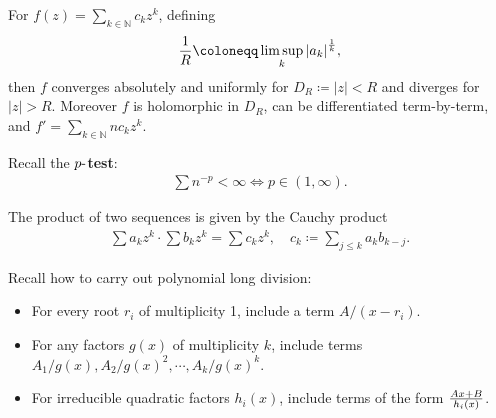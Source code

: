\begin{proposition}

For \(f(z) = \sum_{k\in {\mathbb{N}}} c_k z^k\), defining
\begin{align*}
{1\over R} \coloneqq\limsup_{k} {\left\lvert {a_k} \right\rvert}^{1\over k}
,\end{align*}
then \(f\) converges absolutely and uniformly for
\(D_R \coloneqq{\left\lvert {z} \right\rvert} < R\) and diverges for
\({\left\lvert {z} \right\rvert} > R\). Moreover \(f\) is holomorphic in
\(D_R\), can be differentiated term-by-term, and
\(f' = \sum_{k\in {\mathbb{N}}} n c_k z^k\).

\end{proposition}

\begin{fact}

Recall the \textbf{\(p{\hbox{-}}\)test}:
\begin{align*}
\sum n^{-p} < \infty \iff p \in (1, \infty)
.\end{align*}

\end{fact}

\begin{fact}

The product of two sequences is given by the Cauchy product
\begin{align*}
\sum a_kz^k \cdot \sum b_k z^k = \sum c_k z^k,\quad c_k \coloneqq\sum_{j\leq k} a_k b_{k-j}
.\end{align*}

\end{fact}

\begin{fact}

Recall how to carry out polynomial long division:


\end{fact}

\begin{fact}

\envlist

\begin{itemize}
\tightlist
\item
  For every root \(r_i\) of multiplicity 1, include a term
  \(A/(x-r_i)\).
\item
  For any factors \(g(x)\) of multiplicity \(k\), include terms
  \(A_1/g(x), A_2/g(x)^2, \cdots, A_k / g(x)^k\).
\item
  For irreducible quadratic factors \(h_i(x)\), include terms of the
  form \({Ax+B \over h_i(x)}\).
\end{itemize}

\end{fact}

